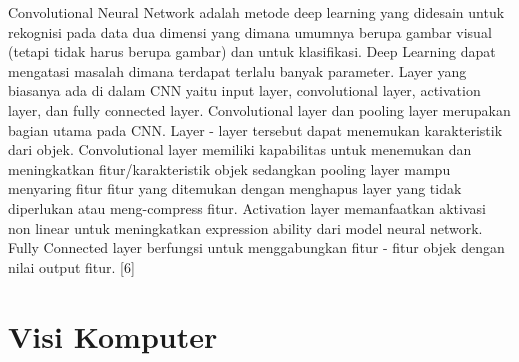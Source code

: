 Convolutional Neural Network adalah metode deep learning yang didesain untuk rekognisi pada data dua dimensi yang dimana umumnya berupa gambar visual (tetapi tidak harus berupa gambar) dan untuk klasifikasi. Deep Learning dapat mengatasi masalah dimana terdapat terlalu banyak parameter.  Layer yang biasanya ada di dalam CNN yaitu input layer, convolutional layer, activation layer, dan fully connected layer.
Convolutional layer dan pooling layer merupakan bagian utama pada CNN. Layer - layer tersebut dapat menemukan karakteristik dari objek. Convolutional layer memiliki kapabilitas untuk menemukan dan meningkatkan fitur/karakteristik objek sedangkan pooling layer mampu menyaring fitur fitur yang ditemukan dengan menghapus layer yang tidak diperlukan atau meng-compress fitur. Activation layer memanfaatkan aktivasi non linear untuk meningkatkan expression ability dari model neural network. Fully Connected layer berfungsi untuk menggabungkan fitur - fitur objek dengan nilai output fitur. [6]







\section{Visi Komputer}
\label{sec:visikomputer}

